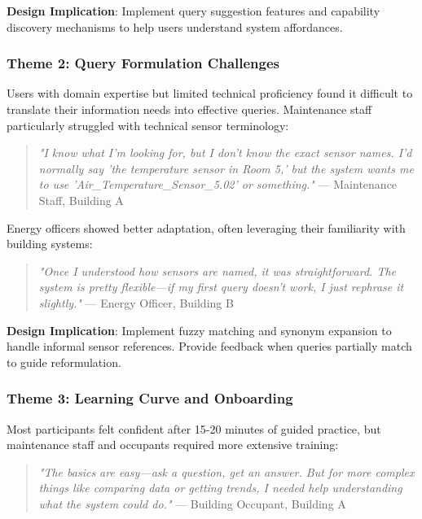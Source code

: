 \documentclass[acmlarge]{acmart}
\begin{document}
\textbf{Design Implication}: Implement query suggestion features and capability discovery mechanisms to help users understand system affordances.

\subsubsection{Theme 2: Query Formulation Challenges}

Users with domain expertise but limited technical proficiency found it difficult to translate their information needs into effective queries. Maintenance staff particularly struggled with technical sensor terminology:

\begin{quote}
\textit{"I know what I'm looking for, but I don't know the exact sensor names. I'd normally say 'the temperature sensor in Room 5,' but the system wants me to use 'Air\_Temperature\_Sensor\_5.02' or something."} — Maintenance Staff, Building A
\end{quote}

Energy officers showed better adaptation, often leveraging their familiarity with building systems:

\begin{quote}
\textit{"Once I understood how sensors are named, it was straightforward. The system is pretty flexible—if my first query doesn't work, I just rephrase it slightly."} — Energy Officer, Building B
\end{quote}

\textbf{Design Implication}: Implement fuzzy matching and synonym expansion to handle informal sensor references. Provide feedback when queries partially match to guide reformulation.

\subsubsection{Theme 3: Learning Curve and Onboarding}

Most participants felt confident after 15-20 minutes of guided practice, but maintenance staff and occupants required more extensive training:

\begin{quote}
\textit{"The basics are easy—ask a question, get an answer. But for more complex things like comparing data or getting trends, I needed help understanding what the system could do."} — Building Occupant, Building A
\end{quote}
\end{document}
